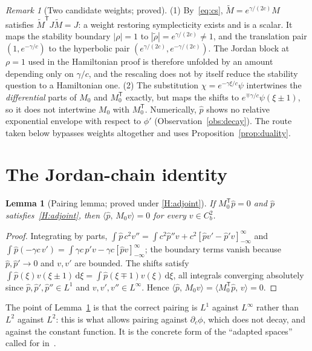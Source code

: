 \documentclass[11pt]{article}
\theoremstyle{plain}
\newtheorem{lemma}[theorem]{Lemma}
\theoremstyle{definition}
\theoremstyle{remark}
\newtheorem{remark}[theorem]{Remark}
\newcommand{\ip}[2]{\langle #1,\,#2\rangle}
\newcommand{\ph}{\hat p}
\newcommand{\dd}{\mathrm{d}}
\newcommand{\T}{\mathsf T}
\newcommand{\tagP}{\textsf{proved}}
\newcommand{\tagC}[1]{\textsf{proved under #1}}
\begin{document}
\begin{remark}[Two candidate weights; \tagP]\label{rem:weights}
(1) By~\eqref{eq:cs}, $\tilde M=e^{\gamma/(2c)}M$ satisfies $\tilde M^{\T}J\tilde M=J$: a weight
restoring symplecticity exists and is a scalar. It maps the stability boundary $|\rho|=1$ to
$|\tilde\rho|=e^{\gamma/(2c)}\neq1$, and the translation pair $(1,e^{-\gamma/c})$ to the
hyperbolic pair $(e^{\gamma/(2c)},e^{-\gamma/(2c)})$. The Jordan block at $\rho=1$ used in the
Hamiltonian proof is therefore unfolded by an amount depending only on $\gamma/c$, and the
rescaling does not by itself reduce the stability question to a Hamiltonian one.
(2) The substitution $\chi=e^{-\gamma\xi/c}\psi$ intertwines the \emph{differential} parts of
$M_0$ and $M_0^{\T}$ exactly, but maps the shifts to
$e^{\mp\gamma/c}\psi(\xi\pm1)$, so it does not intertwine $M_0$ with $M_0^{\T}$. Numerically,
$\ph$ shows no relative exponential envelope with respect to $\phi'$
(Observation~\ref{obs:decay}). The route taken below bypasses weights altogether and uses
Proposition~\ref{prop:duality}.
\end{remark}

\section{The Jordan-chain identity}\label{sec:identity}

\begin{lemma}[Pairing lemma; \tagC{\ref{H:adjoint}}]\label{lem:pairing}
If $M_0^{\T}\ph=0$ and $\ph$ satisfies~\ref{H:adjoint}, then $\ip{\ph}{M_0v}=0$ for every
$v\in C^2_b$.
\end{lemma}

\begin{proof}
Integrating by parts, $\int\ph\,c^2v''=\int c^2\ph''v+c^2[\ph v'-\ph'v]_{-\infty}^{\infty}$ and
$\int\ph(-\gamma c\,v')=\int\gamma c\,\ph'v-\gamma c[\ph v]_{-\infty}^{\infty}$; the boundary terms
vanish because $\ph,\ph'\to0$ and $v,v'$ are bounded. The shifts satisfy
$\int\ph(\xi)v(\xi\pm1)\,\dd\xi=\int\ph(\xi\mp1)v(\xi)\,\dd\xi$, all integrals converging
absolutely since $\ph,\ph',\ph''\in L^1$ and $v,v',v''\in L^\infty$. Hence
$\ip{\ph}{M_0v}=\ip{M_0^{\T}\ph}{v}=0$.
\end{proof}

The point of Lemma~\ref{lem:pairing} is that the correct pairing is $L^1$ against
$L^\infty$ rather than $L^2$ against $L^2$: this is what allows pairing against
$\partial_c\phi$, which does not decay, and against the constant function. It is the concrete
form of the ``adapted spaces'' called for in~\cite{VCKX20}.
\end{document}

